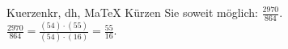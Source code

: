 \begin{MAufgabe}{Kuerzen}{kr, dh, MaTeX}
K\"urzen Sie soweit m\"oglich: $\frac{2970}{864}$.\\ 
\ifLsg\MLoesung
\quad $\frac{2970}{864}=\frac{(54)\cdot(55)}{(54)\cdot(16)}=\frac{55}{16}$.\else\relax\fi
 \end{MAufgabe}